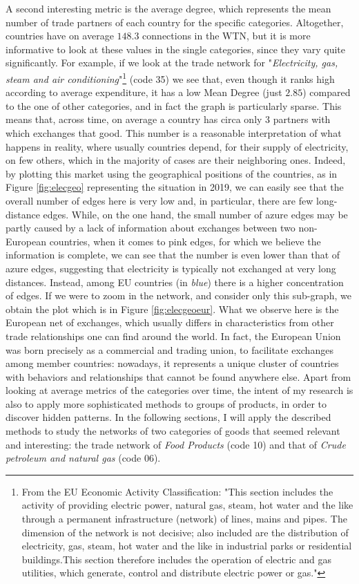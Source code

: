 A second interesting metric is the average degree, which represents the mean number of trade partners of each country for the specific categories. Altogether, countries have on average $148.3$ connections in the WTN, but it is more informative to look at these values in the single categories, since they vary quite significantly. For example, if we look at the trade network for "\textit{Electricity, gas, steam and air conditioning}"\footnote{
    From the EU Economic Activity Classification:
    "This section includes the activity of providing electric power, natural gas, steam, hot water and the like through a permanent infrastructure (network) of lines, mains and pipes. The dimension of the network is not decisive; also included are the distribution of electricity, gas, steam, hot water and the like in industrial parks or residential buildings.This section therefore includes the operation of electric and gas utilities, which generate, control and distribute electric power or gas."\cite{eurostat2022website}
} (code 35) we see that, even though it ranks high according to average expenditure, it has a low Mean Degree (just $2.85$) compared to the one of other categories, and in fact the graph is particularly sparse. This means that, across time, on average a country has circa only 3 partners with which exchanges that good. This number is a reasonable interpretation of what happens in reality, where usually countries depend, for their supply of electricity, on few others, which in the majority of cases are their neighboring ones. Indeed, by plotting this market using the geographical positions of the countries, as in Figure \ref{fig:elecgeo} representing the situation in 2019, we can easily see that the overall number of edges here is very low and, in particular, there are few long-distance edges. While, on the one hand, the small number of azure edges may be partly caused by a lack of information about exchanges between two non-European countries, when it comes to pink edges, for which we believe the information is complete, we can see that the number is even lower than that of azure edges, suggesting that electricity is typically not exchanged at very long distances. Instead, among EU countries (in \textit{blue}) there is a higher concentration of edges. If we were to zoom in the network, and consider only this sub-graph, we obtain the plot which is in Figure \ref{fig:elecgeoeur}. What we observe here is the European net of exchanges, which usually differs in characteristics from other trade relationships one can find around the world. In fact, the European Union was born precisely as a commercial and trading union, to facilitate exchanges among member countries: nowadays, it represents a unique cluster of countries with behaviors and relationships that cannot be found anywhere else.
Apart from looking at average metrics of the categories over time, the intent of my research is also to apply more sophisticated methods to groups of products, in order to discover hidden patterns. In the following sections, I will apply the described methods to study the networks of two categories of goods that seemed relevant and interesting: the trade network of \textit{Food Products} (code 10) and that of \textit{Crude petroleum and natural gas} (code 06).\pagebreak

